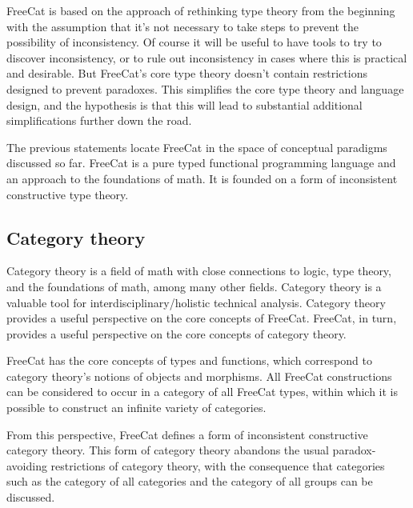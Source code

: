 \documentclass{article}
\begin{document}
FreeCat is based on the approach of rethinking type theory from the beginning with the assumption that it's not necessary to take steps to prevent the possibility of inconsistency. Of course it will be useful to have tools to try to discover inconsistency, or to rule out inconsistency in cases where this is practical and desirable. But FreeCat's core type theory doesn't contain restrictions designed to prevent paradoxes. This simplifies the core type theory and language design, and the hypothesis is that this will lead to substantial additional simplifications further down the road.

The previous statements locate FreeCat in the space of conceptual paradigms discussed so far. FreeCat is a pure typed functional programming language and an approach to the foundations of math. It is founded on a form of inconsistent constructive type theory.

\subsection{Category theory}

Category theory is a field of math with close connections to logic, type theory, and the foundations of math, among many other fields. Category theory is a valuable tool for interdisciplinary/holistic technical analysis. Category theory provides a useful perspective on the core concepts of FreeCat. FreeCat, in turn, provides a useful perspective on the core concepts of category theory.

FreeCat has the core concepts of types and functions, which correspond to category theory's notions of objects and morphisms. All FreeCat constructions can be considered to occur in a category of all FreeCat types, within which it is possible to construct an infinite variety of categories.

From this perspective, FreeCat defines a form of inconsistent constructive category theory. This form of category theory abandons the usual paradox-avoiding restrictions of category theory, with the consequence that categories such as the category of all categories and the category of all groups can be discussed.
\end{document}
